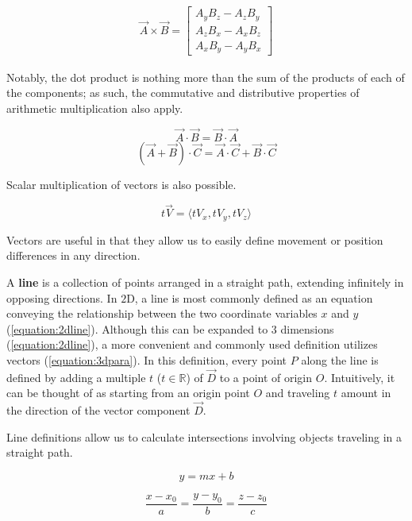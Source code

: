 \documentclass[a4paper]{article}
\begin{document}
\begin{equation}\label{equation:crossproduct}
    \begin{split}
        \vec{A} \times \vec{B} =
        \begin{bmatrix}
            A_{y}B_{z} - A_{z}B_{y} \\
            A_{z}B_{x} - A_{x}B_{z} \\
            A_{x}B_{y} - A_{y}B_{x}
        \end{bmatrix}
    \end{split}
\end{equation}

Notably, the dot product is nothing more than the sum of the products of each of the components; as such, the commutative and distributive properties of arithmetic multiplication also apply.

\[
\vec{A} \cdot \vec{B} = \vec{B} \cdot \vec{A}
\]
\[
(\vec{A} + \vec{B}) \cdot \vec{C} = \vec{A} \cdot \vec{C} + \vec{B} \cdot \vec{C}
\]

Scalar multiplication of vectors is also possible.

\[
t\vec{V} = \langle tV_{x}, tV_{y}, tV_{z} \rangle
\]

Vectors are useful in that they allow us to easily define movement or position differences in any direction.

A \textbf{line} is a collection of points arranged in a straight path, extending infinitely in opposing directions.\autocite{BritannicaLine2009} In $2$D, a line is most commonly defined as an equation conveying the relationship between the two coordinate variables $x$ and $y$ (\ref{equation:2dline}). Although this can be expanded to $3$ dimensions (\ref{equation:2dline}), a more convenient and commonly used definition utilizes vectors (\ref{equation:3dpara}). In this definition, every point $P$ along the line is defined by adding a multiple $t$ ($t \in \mathbb{R}$) of $\vec{D}$ to a point of origin $O$. Intuitively, it can be thought of as starting from an origin point $O$ and traveling $t$ amount in the direction of the vector component $\vec{D}$.

Line definitions allow us to calculate intersections involving objects traveling in a straight path.

\begin{equation}\label{equation:2dline}
    y = mx + b
\end{equation}

\begin{equation}\label{equation:3dpara}
    \frac{x - x_{0}}{a} = \frac{y - y_{0}}{b} = \frac{z - z_{0}}{c}
\end{equation}
\end{document}
